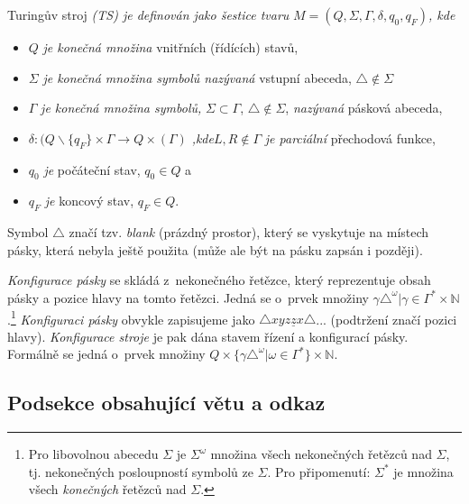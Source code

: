 \documentclass[twocolumn, a4paper, titlepage, 11pt]{article}
\begin{document}
\begin{definition}{Turingův stroj} \label{def:turing-stroj}
\emph{(TS) je definován jako šestice tvaru} $M = (Q, \Sigma, \Gamma, \delta, q_0, q_F)$\emph{, kde}
\begin{itemize}


	\item $Q$ \emph{je konečná množina} vnitřních (řídících) stavů,
    
    
	\item $\Sigma$ \emph{je konečná množina symbolů nazývaná} vstupní abeceda, $\triangle \not\in \Sigma$ 
    
    
	\item $\Gamma$ \emph{je konečná množina symbolů,} $\Sigma \subset \Gamma$, $\triangle \not \in \Sigma $, \emph{nazývaná} pásková abeceda,
    
    
	\item $\delta:(Q\backslash\{q_F\}\times \Gamma \rightarrow Q\times(\Gamma)$ \emph{,kde}$L, R \not \in \Gamma$ \emph{je parciální} přechodová funkce,
    
    
	\item $q_0$ \emph{je} počáteční stav, $q_0 \in Q$ a
    
    
	\item $q_F$ \emph{je} koncový stav, $q_F \in Q$.
    
    
\end{itemize}
\end{definition}

Symbol $\triangle$ značí tzv. \emph{blank} (prázdný prostor), který se vyskytuje na místech pásky, která nebyla ještě použita (může ale být na pásku zapsán i později).

\emph{Konfigurace pásky} se skládá z~nekonečného řetězce, který reprezentuje obsah pásky a  pozice hlavy na tomto řetězci. Jedná se o~prvek množiny ${\gamma\triangle ^ \omega | \gamma\in\Gamma ^*} \times  \mathbb{N}$.\footnote{  Pro libovolnou abecedu $\Sigma$ je $\Sigma ^ \omega$ množina všech nekonečných řetězců nad $\Sigma$, tj. nekonečných posloupností symbolů ze $\Sigma$. Pro připomenutí: $\Sigma ^ *$ je množina všech \emph{konečných} řetězců nad $\Sigma$.} \emph{Konfiguraci pásky} obvykle zapisujeme jako $\triangle xyz\underline{z}x \triangle$... (podtržení značí pozici hlavy). \emph{Konfigurace stroje} je pak dána stavem řízení a konfigurací pásky. Formálně se jedná o~prvek množiny $ Q \times \{ \gamma \triangle ^ \omega | \omega \in \Gamma ^ *\} \times \mathbb{N}$.


\subsection{Podsekce obsahující větu a odkaz}
\end{document}

